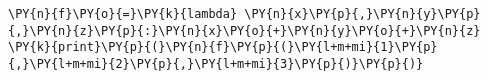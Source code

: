 \begin{Verbatim}[commandchars=\\\{\}]
\PY{n}{f}\PY{o}{=}\PY{k}{lambda} \PY{n}{x}\PY{p}{,}\PY{n}{y}\PY{p}{,}\PY{n}{z}\PY{p}{:}\PY{n}{x}\PY{o}{+}\PY{n}{y}\PY{o}{+}\PY{n}{z}
\PY{k}{print}\PY{p}{(}\PY{n}{f}\PY{p}{(}\PY{l+m+mi}{1}\PY{p}{,}\PY{l+m+mi}{2}\PY{p}{,}\PY{l+m+mi}{3}\PY{p}{)}\PY{p}{)}
\end{Verbatim}
